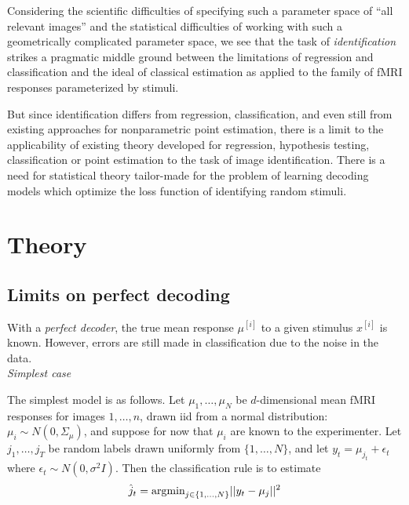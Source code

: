 \documentclass[11pt]{article}
\begin{document}
Considering the scientific difficulties of specifying such a parameter
space of ``all relevant images'' and the statistical difficulties of
working with such a geometrically complicated parameter space, we see
that the task of \emph{identification} strikes a pragmatic middle
ground between the limitations of regression and classification and
the ideal of classical estimation as applied to the family of fMRI
responses parameterized by stimuli.

But since identification differs from regression, classification, and
even still from existing approaches for nonparametric point
estimation, there is a limit to the applicability of existing theory
developed for regression, hypothesis testing, classification or point
estimation to the task of image identification.  There is a need for
statistical theory tailor-made for the problem of learning decoding
models which optimize the loss function of identifying random stimuli.

\section{Theory}

\subsection{Limits on perfect decoding}

With a \emph{perfect decoder}, the true mean response $\mu^{[i]}$ to
a given stimulus $x^{[i]}$ is known.  However, errors are still made
in classification due to the noise in the data.
\\

\noindent\emph{Simplest case}

The simplest model is as follows.  Let $\mu_1,\hdots, \mu_N$ be
$d$-dimensional mean fMRI responses for images $1,\hdots, n$, drawn
iid from a normal distribution: $\mu_i \sim N(0, \Sigma_\mu)$, and
suppose for now that $\mu_i$ are known to the experimenter.  Let
$j_1,\hdots, j_T$ be random labels drawn uniformly from $\{1,\hdots,
N\}$, and let $y_t = \mu_{j_t} + \epsilon_t$ where $\epsilon_t \sim
N(0, \sigma^2 I)$.  Then the classification rule is to estimate
\[
\hat{j}_t = \text{argmin}_{j \in \{1, \hdots, N\}} ||y_t - \mu_j||^2
\]
\end{document}
